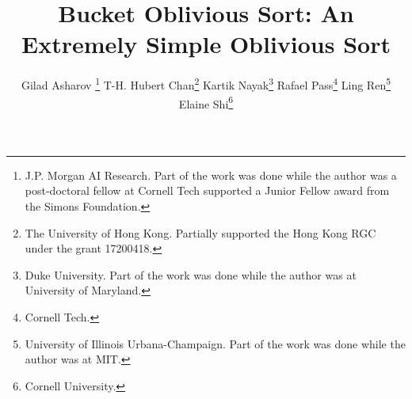 \documentclass[twoside,leqno,twocolumn]{article}
\begin{document}
\title{Bucket Oblivious Sort: An Extremely Simple Oblivious Sort}

\author{Gilad Asharov \thanks{J.P. Morgan AI Research. Part of the work was done while the author was a post-doctoral fellow at Cornell Tech supported a Junior Fellow award from the Simons Foundation.} \quad
T-H. Hubert Chan\thanks{The University of Hong Kong. Partially supported the Hong Kong RGC under the grant 17200418.} \quad
Kartik Nayak\thanks{Duke University. Part of the work was done while the author was at University of Maryland.} \quad
Rafael Pass\thanks{Cornell Tech.} \quad
Ling Ren\thanks{University of Illinois Urbana-Champaign. Part of the work was done while the author was at MIT.} \quad
Elaine Shi\thanks{Cornell University.}}

\newcommand{\rl}[1]{{\footnotesize\color{orange}[Ling: #1]}}

\date{}

\maketitle


\begin{abstract}

\end{abstract}





{
\small


}
\end{document}
